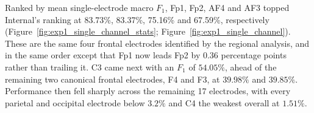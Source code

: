 Ranked by mean single-electrode macro $F_1$, Fp1, Fp2, AF4 and AF3 topped Internal's ranking at 83.73\%, 83.37\%, 75.16\% and 67.59\%, respectively (Figure~\ref{fig:exp1_single_channel_stats}; Figure~\ref{fig:exp1_single_channel}). These are the same four frontal electrodes identified by the regional analysis, and in the same order except that Fp1 now leads Fp2 by 0.36 percentage points rather than trailing it. C3 came next with an $F_1$ of $54.05\%$, ahead of the remaining two canonical frontal electrodes, F4 and F3, at $39.98\%$ and $39.85\%$. Performance then fell sharply across the remaining 17 electrodes, with every parietal and occipital electrode below $3.2\%$ and C4 the weakest overall at $1.51\%$.
